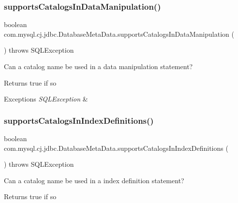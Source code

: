 \subsubsection{\texorpdfstring{supports\+Catalogs\+In\+Data\+Manipulation()}{supportsCatalogsInDataManipulation()}}
{\footnotesize\ttfamily boolean com.\+mysql.\+cj.\+jdbc.\+Database\+Meta\+Data.\+supports\+Catalogs\+In\+Data\+Manipulation (\begin{DoxyParamCaption}{ }\end{DoxyParamCaption}) throws S\+Q\+L\+Exception}

Can a catalog name be used in a data manipulation statement?

\begin{DoxyReturn}{Returns}
true if so 
\end{DoxyReturn}

\begin{DoxyExceptions}{Exceptions}
{\em S\+Q\+L\+Exception} & \\
\hline
\end{DoxyExceptions}
\mbox{\label{classcom_1_1mysql_1_1cj_1_1jdbc_1_1_database_meta_data_ad7ef9e76b46b628b341502e856bf7cae}} 
\subsubsection{\texorpdfstring{supports\+Catalogs\+In\+Index\+Definitions()}{supportsCatalogsInIndexDefinitions()}}
{\footnotesize\ttfamily boolean com.\+mysql.\+cj.\+jdbc.\+Database\+Meta\+Data.\+supports\+Catalogs\+In\+Index\+Definitions (\begin{DoxyParamCaption}{ }\end{DoxyParamCaption}) throws S\+Q\+L\+Exception}

Can a catalog name be used in a index definition statement?

\begin{DoxyReturn}{Returns}
true if so 
\end{DoxyReturn}

